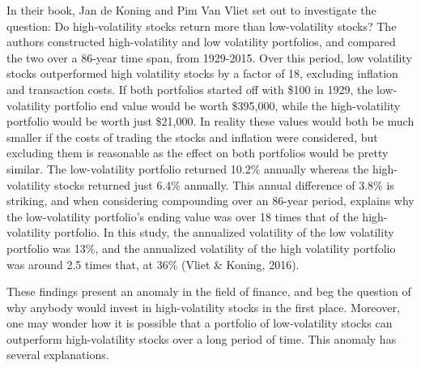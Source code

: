 \documentclass[12pt,twoside]{reedthesis}
\theoremstyle{definition}
\theoremstyle{definition}
\theoremstyle{definition}
\theoremstyle{remark}
\begin{document}
In their book, Jan de Koning and Pim Van Vliet set out to investigate
the question: Do high-volatility stocks return more than low-volatility
stocks? The authors constructed high-volatility and low volatility
portfolios, and compared the two over a 86-year time span, from
1929-2015. Over this period, low volatility stocks outperformed high
volatility stocks by a factor of 18, excluding inflation and transaction
costs. If both portfolios started off with \$100 in 1929, the
low-volatility portfolio end value would be worth \$395,000, while the
high-volatility portfolio would be worth just \$21,000. In reality these
values would both be much smaller if the costs of trading the stocks and
inflation were considered, but excluding them is reasonable as the
effect on both portfolios would be pretty similar. The low-volatility
portfolio returned 10.2\% annually whereas the high-volatility stocks
returned just 6.4\% annually. This annual difference of 3.8\% is
striking, and when considering compounding over an 86-year period,
explains why the low-volatility portfolio's ending value was over 18
times that of the high-volatility portfolio. In this study, the
annualized volatility of the low volatility portfolio was 13\%, and the
annualized volatility of the high volatility portfolio was around 2.5
times that, at 36\% (Vliet \& Koning, 2016).

These findings present an anomaly in the field of finance, and beg the
question of why anybody would invest in high-volatility stocks in the
first place. Moreover, one may wonder how it is possible that a
portfolio of low-volatility stocks can outperform high-volatility stocks
over a long period of time. This anomaly has several explanations.
\end{document}
